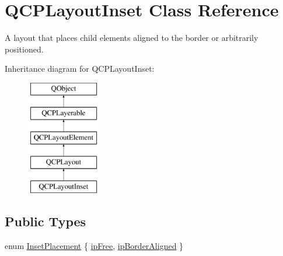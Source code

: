 \hypertarget{class_q_c_p_layout_inset}{}\section{Q\+C\+P\+Layout\+Inset Class Reference}
\label{class_q_c_p_layout_inset}


A layout that places child elements aligned to the border or arbitrarily positioned.  


Inheritance diagram for Q\+C\+P\+Layout\+Inset\+:\begin{figure}[H]
\begin{center}
\leavevmode
\includegraphics[height=5.000000cm]{class_q_c_p_layout_inset}
\end{center}
\end{figure}
\subsection*{Public Types}
\begin{DoxyCompactItemize}
\item 
enum \mbox{\hyperlink{class_q_c_p_layout_inset_a8b9e17d9a2768293d2a7d72f5e298192}{Inset\+Placement}} \{ \mbox{\hyperlink{class_q_c_p_layout_inset_a8b9e17d9a2768293d2a7d72f5e298192aa4802986ea2cea457f932b115acba59e}{ip\+Free}}, 
\mbox{\hyperlink{class_q_c_p_layout_inset_a8b9e17d9a2768293d2a7d72f5e298192aa81e7df4a785ddee2229a8f47c46e817}{ip\+Border\+Aligned}}
 \}
\end{DoxyCompactItemize}
